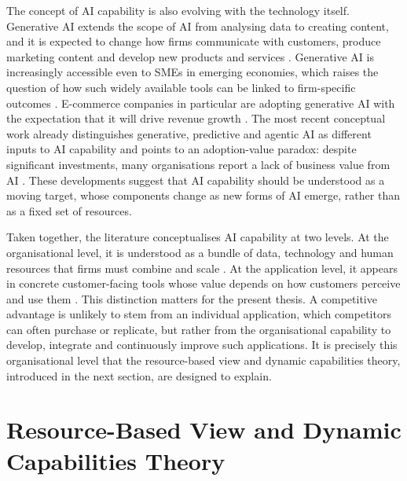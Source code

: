 The concept of AI capability is also evolving with the technology itself. Generative AI extends the scope of AI from analysing data to creating content, and it is expected to change how firms communicate with customers, produce marketing content and develop new products and services \parencite[702]{grewal2025}. Generative AI is increasingly accessible even to SMEs in emerging economies, which raises the question of how such widely available tools can be linked to firm-specific outcomes \parencite[1]{slrR091}. E-commerce companies in particular are adopting generative AI with the expectation that it will drive revenue growth \parencite[93]{slrR219}. The most recent conceptual work already distinguishes generative, predictive and agentic AI as different inputs to AI capability and points to an adoption-value paradox: despite significant investments, many organisations report a lack of business value from AI \parencite[1]{slrR086}. These developments suggest that AI capability should be understood as a moving target, whose components change as new forms of AI emerge, rather than as a fixed set of resources.

Taken together, the literature conceptualises AI capability at two levels. At the organisational level, it is understood as a bundle of data, technology and human resources that firms must combine and scale \parencites[1]{mikalef2021capability}[574]{sjodin2021}. At the application level, it appears in concrete customer-facing tools whose value depends on how customers perceive and use them \parencites[1]{gao2025}[1483]{shabankareh2025}. This distinction matters for the present thesis. A competitive advantage is unlikely to stem from an individual application, which competitors can often purchase or replicate, but rather from the organisational capability to develop, integrate and continuously improve such applications. It is precisely this organisational level that the resource-based view and dynamic capabilities theory, introduced in the next section, are designed to explain.

\section{Resource-Based View and Dynamic Capabilities Theory}
\label{sec:rbv-dc}

